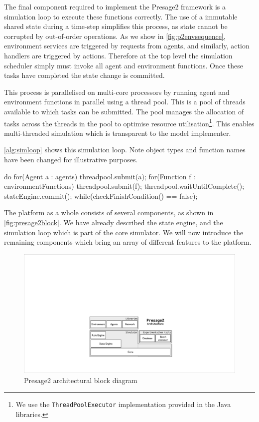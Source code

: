 The final component required to implement the Presage2 framework is a
simulation loop to execute these functions correctly. The use of a immutable
shared state during a time-step simplifies this process, as state cannot be
corrupted by out-of-order operations. As we show in
\autoref{fig:p2envsequence}, environment services are triggered by requests
from agents, and similarly, action handlers are triggered by actions.
Therefore at the top level the simulation scheduler simply must invoke all
agent and environment functions. Once these tasks have completed the state
change is committed.

This process is parallelised on multi-core processors by running agent and
environment functions in parallel using a thread pool. This is a pool of
threads available to which tasks can be submitted. The pool manages the
allocation of tasks across the threads in the pool to optimise resource
utilisation\footnote{We use the \texttt{ThreadPoolExecutor} implementation
provided in the Java libraries.}. This enables multi-threaded simulation which
is transparent to the model implementer.

\autoref{alg:simloop} shows this simulation loop. Note object types and function names have been changed for illustrative purposes.

\begin{java}[caption={Presage2 multi-threaded simulation loop},label=alg:simloop]
do {
	for(Agent a : agents) {
		threadpool.submit(a);
	}
	for(Function f : environmentFunctions) {
		threadpool.submit(f);
	}
	threadpool.waitUntilComplete();
	stateEngine.commit();
} while(checkFinishCondition() == false);
\end{java}

The platform as a whole consists of several components, as shown in
\autoref{fig:presage2block}. We have already described the state engine, and
the simulation loop which is part of the core simulator. We will now introduce
the remaining components which bring an array of different features to the
platform.

\begin{figure}[tb]
\caption{Presage2 architectural block diagram}\label{fig:presage2block}
\includegraphics[width=\linewidth]{gfx/presage2/architecture_block}
\end{figure}

